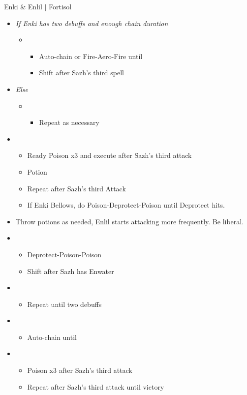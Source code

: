 \documentclass{report}
\begin{document}
\begin{battle}{Enki \& Enlil $|$ Fortisol}
\begin{multicols}{2}
\begin{itemize}
\begin{itemize}
    \end{itemize}
    \item \textit{If Enki has two debuffs and enough chain duration}
    \begin{itemize}
        \item \fourth
        \begin{itemize}
            \item Auto-chain or Fire-Aero-Fire until \stagger
            \item Shift after Sazh's third spell
        \end{itemize}
    \end{itemize}
    \item \textit{Else}
    \begin{itemize}
        \item \fifth
        \begin{itemize}
            \item Repeat as necessary
        \end{itemize}
    \end{itemize}
    \item \second
    \begin{itemize}
        \item Ready Poison x3 and execute after Sazh's third attack
        \item Potion
        \item Repeat after Sazh's third Attack
        \item If Enki Bellows, do Poison-Deprotect-Poison until Deprotect hits.
    \end{itemize}
    \item Throw potions as needed, Enlil starts attacking more frequently. Be liberal.
    \item \third
    \begin{itemize}
        \item Deprotect-Poison-Poison
        \item Shift after Sazh has Enwater
    \end{itemize}
    \item \fifth
    \begin{itemize}
        \item Repeat until two debuffs
    \end{itemize}
    \item \fourth
    \begin{itemize}
        \item Auto-chain until \stagger
    \end{itemize}
    \item \second
    \begin{itemize}
        \item Poison x3 after Sazh's third attack
        \item Repeat after Sazh's third attack until victory
    \end{itemize}
\end{itemize}
\vfill\null
\end{multicols}
\end{battle}
\end{document}
